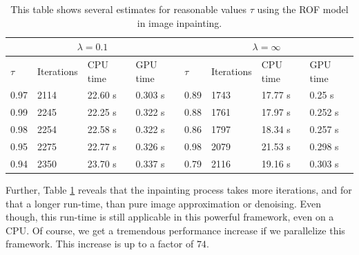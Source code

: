 \documentclass[abstracton]{scrreprt}
\begin{document}
            \begin{table}[!ht]
                \parbox{.9\linewidth}{
                \centering
                    \begin{tabular}{| l | l | l | l | l | l | l | l |}
                        \hline
                        \multicolumn{4}{|c|}{$\lambda = 0.1$} & \multicolumn{4}{|c|}{$\lambda = \infty$} \\ \hline\hline
                        $\tau$ & Iterations & CPU time & GPU time & $\tau$ & Iterations & CPU time & GPU time \\ \hline
                        0.97 & 2114 & 22.60 s & 0.303 s & 0.89 & 1743 & 17.77 s & 0.25 s \\ \hline
                        0.99 & 2245 & 22.25 s & 0.322 s & 0.88 & 1761 & 17.97 s & 0.252 s \\ \hline
                        0.98 & 2254 & 22.58 s & 0.322 s & 0.86 & 1797 & 18.34 s & 0.257 s \\ \hline
                        0.95 & 2275 & 22.77 s & 0.326 s & 0.98 & 2079 & 21.53 s & 0.298 s \\ \hline
                        0.94 & 2350 & 23.70 s & 0.337 s & 0.79 & 2116 & 19.16 s & 0.303 s \\ \hline
                    \end{tabular}
                }
                \caption[Best estimate of $\tau$ for image inpainting.]{This table shows several estimates for reasonable values $\tau$ using the ROF model in image inpainting.}
                \label{tab:best_tau_inpaint}
            \end{table}
        Further, Table \ref{tab:best_tau_inpaint} reveals that the inpainting process takes more iterations, and for that a longer run-time, than pure image approximation or denoising. Even though, this run-time is still applicable in this powerful framework, even on a CPU. Of course, we get a tremendous performance increase if we parallelize this framework. This increase is up to a factor of $74$.
\end{document}
